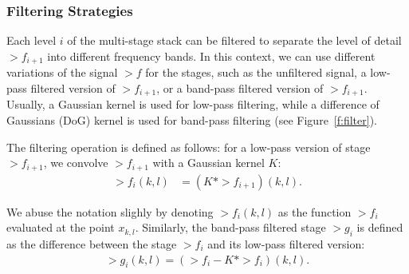 \subsubsection{Filtering Strategies}

Each level $i$ of the multi-stage stack can be filtered to separate the level of detail $\gt{f}_{i+1}$ into different frequency bands. In this context, we can use different variations of the signal \(\gt{f}\) for the stages, such as the unfiltered signal, a low-pass filtered version of \(\gt{f}_{i+1}\), or a band-pass filtered version of \(\gt{f}_{i+1}\). Usually, a Gaussian kernel is used for low-pass filtering, while a difference of Gaussians (DoG) kernel is used for band-pass filtering (see Figure~\ref{f:filter}).

The filtering operation is defined as follows: for a low-pass version of stage \(\gt{f}_{i+1}\), we convolve \(\gt{f}_{i+1}\) with a Gaussian kernel \( K \):
\begin{align}\label{e-gaussian-filter}
    \gt{f}_i(k,l) &= \left( K * \gt{f}_{i+1} \right)(k, l).
\end{align}

We abuse the notation slighly by denoting $\gt{f}_i(k,l)$ as the function $\gt{f}_i$ evaluated at the point $x_{k,l}$.
Similarly, the band-pass filtered stage \(\gt{g}_i\) is defined as the difference between the stage \(\gt{f}_i\) and its low-pass filtered version:
\begin{align}
    \gt{g}_i(k,l) = \left( \gt{f}_{i} - K * \gt{f}_{i} \right)(k, l).
\end{align}



